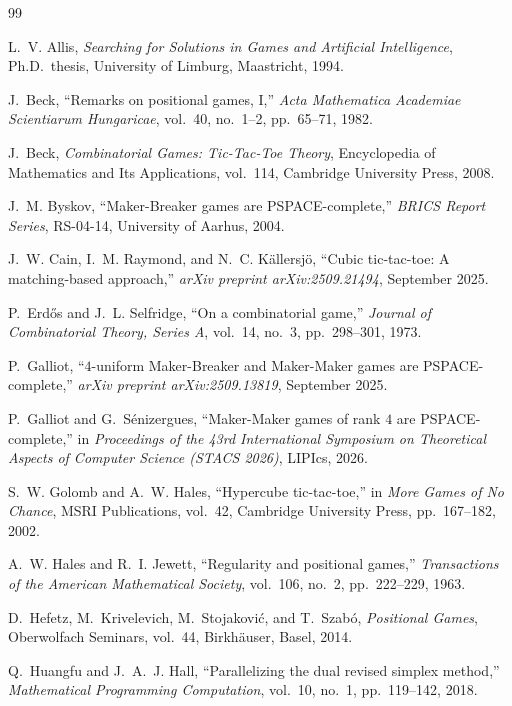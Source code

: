 \documentclass[11pt,a4paper]{article}
\theoremstyle{definition}
\theoremstyle{remark}
\begin{document}
\begin{thebibliography}{99}

L.~V. Allis,
\emph{Searching for Solutions in Games and Artificial Intelligence},
Ph.D.\ thesis, University of Limburg, Maastricht, 1994.

J.~Beck,
``Remarks on positional games, I,''
\emph{Acta Mathematica Academiae Scientiarum Hungaricae}, vol.~40, no.~1--2, pp.~65--71, 1982.

J.~Beck,
\emph{Combinatorial Games: Tic-Tac-Toe Theory},
Encyclopedia of Mathematics and Its Applications, vol.~114, Cambridge University Press, 2008.

J.~M. Byskov,
``Maker-Breaker games are PSPACE-complete,''
\emph{BRICS Report Series}, RS-04-14, University of Aarhus, 2004.

J.~W. Cain, I.~M. Raymond, and N.~C. K\"allersj\"o,
``Cubic tic-tac-toe: A matching-based approach,''
\emph{arXiv preprint arXiv:2509.21494}, September 2025.

P.~Erd\H{o}s and J.~L. Selfridge,
``On a combinatorial game,''
\emph{Journal of Combinatorial Theory, Series A}, vol.~14, no.~3, pp.~298--301, 1973.

P.~Galliot,
``$4$-uniform Maker-Breaker and Maker-Maker games are PSPACE-complete,''
\emph{arXiv preprint arXiv:2509.13819}, September 2025.

P.~Galliot and G.~S\'enizergues,
``Maker-Maker games of rank $4$ are PSPACE-complete,''
in \emph{Proceedings of the 43rd International Symposium on Theoretical Aspects of Computer Science (STACS 2026)}, LIPIcs, 2026.

S.~W. Golomb and A.~W. Hales,
``Hypercube tic-tac-toe,''
in \emph{More Games of No Chance}, MSRI Publications, vol.~42, Cambridge University Press, pp.~167--182, 2002.

A.~W. Hales and R.~I. Jewett,
``Regularity and positional games,''
\emph{Transactions of the American Mathematical Society}, vol.~106, no.~2, pp.~222--229, 1963.

D.~Hefetz, M.~Krivelevich, M.~Stojakovi\'c, and T.~Szab\'o,
\emph{Positional Games},
Oberwolfach Seminars, vol.~44, Birkh\"auser, Basel, 2014.

Q.~Huangfu and J.~A.~J. Hall,
``Parallelizing the dual revised simplex method,''
\emph{Mathematical Programming Computation}, vol.~10, no.~1, pp.~119--142, 2018.


\end{thebibliography}
\end{document}
